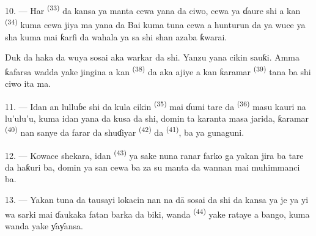 \VUsaut{4.2mm}
\VUsaut{3.0mm}

10. --- Har  \textsuperscript{(33)} da kansa ya manta cewa
yana da ciwo, cewa  ya ɗaure shi a kan
 \textsuperscript{(34)} kuma cewa jiya ma
yana da  Bai kuma tuna cewa a hunturun da ya
wuce ya sha  kuma  mai ƙarfi da wahala
ya sa shi shan azaba ƙwarai.

Duk da haka da wuya sosai aka warkar da shi. Yanzu yana cikin sauƙi.
Amma ƙafarsa wadda yake jingina a kan 
\textsuperscript{(38)} da aka ajiye a kan ƙaramar 
\textsuperscript{(39)} tana ba shi ciwo ita ma.

11. --- Idan an lulluɓe shi da kula cikin 
\textsuperscript{(35)} mai ɗumi tare da 
\textsuperscript{(36)} masu kauri na lu’ulu’u, kuma idan yana da
kusa da shi, domin ta karanta masa jarida, ƙaramar 
\textsuperscript{(40)} nan sanye da farar  da shuɗiyar
 \textsuperscript{(42)} da 
\textsuperscript{(41)}, ba ya gunaguni.

12. --- Kowace shekara, idan  \textsuperscript{(43)}
ya sake nuna  ranar farko ga 
yakan jira  ba tare da haƙuri ba, domin ya san cewa
ba za su manta da wannan  mai muhimmanci ba.

13. --- Yakan tuna da tausayi lokacin nan na dā sosai da shi da kansa
ya je ya yi wa  sarki mai ɗaukaka fatan barka da
biki, wanda  \textsuperscript{(44)} yake rataye a
bango, kuma wanda yake  ƴaƴansa.

\VUsaut{6.0mm}
\VUfilet{22mm}
